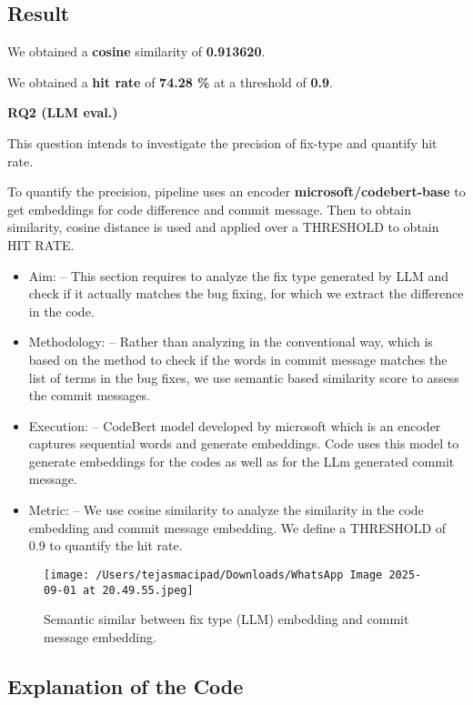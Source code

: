 \documentclass[12pt, a4paper]{report}
\begin{document}
\subsection*{Result}

We obtained a \textbf{cosine} similarity of \textbf{0.913620}.

We obtained a \textbf{hit rate} of \textbf{74.28 \%} at a threshold of \textbf{0.9}.


\newpage

\textbf{RQ2 (LLM eval.)}

This question intends to investigate the precision of fix-type and quantify hit rate.

To quantify the precision, pipeline uses an encoder \textbf{microsoft/codebert-base} to get embeddings for code difference and commit message. Then to obtain similarity, cosine distance is used and applied over a THRESHOLD to obtain HIT RATE.


\begin{itemize}
    \item {Aim:} -- This section requires to analyze the fix type generated by LLM and check if it actually matches the bug fixing, for which we extract the difference in the code.
    \item {Methodology:} -- Rather than analyzing in the conventional way, which is based on the method to check if the words in commit message matches the list of terms in the bug fixes, we use semantic based similarity score to assess the commit messages.
    \item {Execution:} -- CodeBert model developed by microsoft which is an encoder captures sequential words and generate embeddings. Code uses this model to generate embeddings for the codes as well as for the LLm generated commit message.
    \item {Metric: } -- We use cosine similarity to analyze the similarity in the code embedding and commit message embedding. We define a THRESHOLD of 0.9 to quantify the hit rate. 
\end{itemize}

\begin{figure}[h!]
    \centering
    \texttt{[image: /Users/tejasmacipad/Downloads/WhatsApp Image 2025-09-01 at 20.49.55.jpeg]}
    \caption{Semantic similar between fix type (LLM) embedding and commit message embedding.}
\end{figure}


\subsection*{Explanation of the Code}
\end{document}

